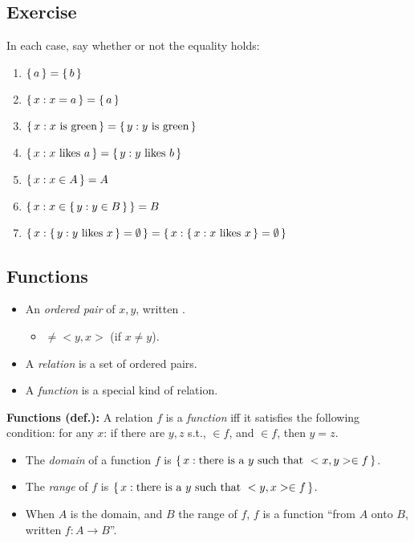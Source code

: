 \documentclass[letterpaper,parskip=half]{scrartcl}
\begin{document}
\subsection{Exercise}
\label{sec:org65a2211}

In each case, say whether or not the equality holds:

\begin{enumerate}
\item \(\set{a} = \set{b}\)
\item \(\set{x : x = a} = \set{a}\)
\item \(\set{x : x\text{ is green} } = \set{y : y\text{ is green} }\)
\item \(\set{x : x\text{ likes }a } = \set{y : y\text{ likes }b }\)
\item \(\set{x : x \in A} = A\)
\item \(\set{x : x \in  \set{y : y \in  B}} = B\)
\item \(\set{x : \set{y : y\text{ likes }x } = \emptyset } = \set{x : \set{x : x\text{ likes }x } = \emptyset }\)
\end{enumerate}
\subsection{Functions}
\label{sec:org848480b}

\begin{itemize}
\item An \emph{ordered pair} of \(x,y\), written \(<x,y>\).
\begin{itemize}
\item \(<x,y> \neq <y,x>\) (if \(x \neq y\)).
\end{itemize}
\item A \emph{relation} is a set of ordered pairs.
\item A \emph{function} is a special kind of relation.
\end{itemize}

\begin{exe}
\ex \textbf{Functions (def.):} A relation \(f\) is a \emph{function} iff it satisfies the following condition: for any \(x\): if there are \(y,z\) s.t., \(<x,y> \in f\), and \(<x,z> \in  f\), then \(y = z\).
\label{org1b9e58e}
\end{exe}

\begin{itemize}
\item The \emph{domain} of a function \(f\) is \(\set{x : \text{there is a }y\text{ such that }<x,y> \in f  }\).
\item The \emph{range} of \(f\) is \(\set{x : \text{there is a }y\text{ such that }<y,x> \in  f  }\).
\item When \(A\) is the domain, and \(B\) the range of \(f\), \(f\) is a function ``from \(A\) onto \(B\), written \(f : A \rightarrow B\)''.
\end{itemize}
\end{document}

